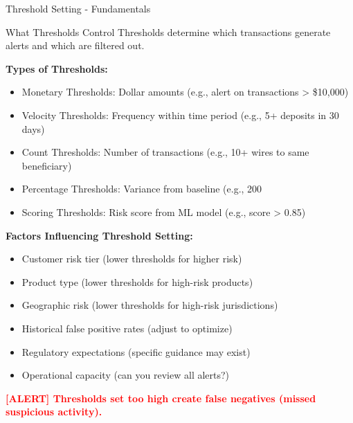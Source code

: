 \documentclass[11pt,a4paper]{beamer}
\newcommand{\redflag}[1]{\textcolor{red}{\textbf{[ALERT] #1}}}
\begin{document}
	\begin{frame}{Threshold Setting - Fundamentals}
		\begin{block}{What Thresholds Control}
			Thresholds determine which transactions generate alerts and which are filtered out.
		\end{block}
		
		\textbf{Types of Thresholds:}
		\begin{itemize}
			\item Monetary Thresholds: Dollar amounts (e.g., alert on transactions > \$10,000)
			\item Velocity Thresholds: Frequency within time period (e.g., 5+ deposits in 30 days)
			\item Count Thresholds: Number of transactions (e.g., 10+ wires to same beneficiary)
			\item Percentage Thresholds: Variance from baseline (e.g., 200%
			\item Scoring Thresholds: Risk score from ML model (e.g., score > 0.85)
		\end{itemize}
		
		\textbf{Factors Influencing Threshold Setting:}
		\begin{itemize}
			\item Customer risk tier (lower thresholds for higher risk)
			\item Product type (lower thresholds for high-risk products)
			\item Geographic risk (lower thresholds for high-risk jurisdictions)
			\item Historical false positive rates (adjust to optimize)
			\item Regulatory expectations (specific guidance may exist)
			\item Operational capacity (can you review all alerts?)
		\end{itemize}
		
		\redflag{Thresholds set too high create false negatives (missed suspicious activity).}
	\end{frame}
	
\end{document}
